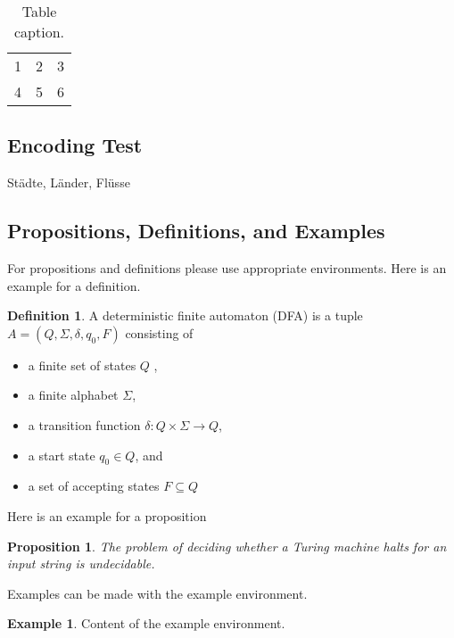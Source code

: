 \documentclass[seminar,palatino]{AIGpaper}
\newtheorem{proposition}[theorem]{Proposition}
\theoremstyle{definition}
\newtheorem{definition}[theorem]{Definition}
\newtheorem{example}[theorem]{Example}
\begin{document}
\begin{table*}[ht]
\begin{center}
\begin{tabular}{lll}
\hline
1&2&3\\
4&5&6\\
\hline
\end{tabular}
\end{center}
\caption{Table caption.} \label{tab:t1}
\end{table*}



\subsection{Encoding Test}
Städte, Länder, Flüsse


\subsection{Propositions, Definitions, and Examples}
For propositions and definitions please use appropriate environments.
Here is an example for a definition.

\begin{definition}
	A deterministic finite automaton (DFA) is a tuple \( A=(Q,\Sigma,\delta,q_0,F) \) consisting of
	\begin{itemize}
		\item a finite set of states \( Q \) ,
		\item a finite alphabet \( \Sigma \),
		\item a transition function \( \delta:Q\times\Sigma\to Q \), 
		\item a start state \( q_0 \in Q \), and
		\item a set of accepting states \( F \subseteq Q \)
	\end{itemize}
\end{definition}

Here is an example for a proposition

\begin{proposition}
	The problem of deciding whether a Turing machine halts for an input string is undecidable.
\end{proposition}

Examples can be made with the example environment.

\begin{example}
	Content of the example environment.
\end{example}


\addreferences

\end{document}
